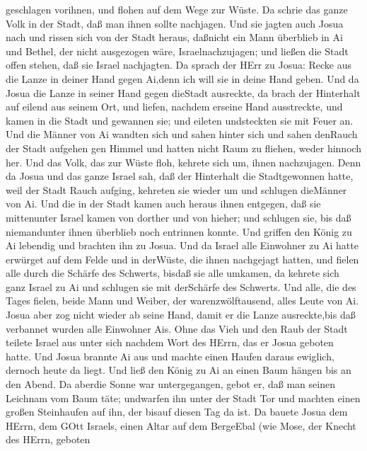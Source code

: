 geschlagen vorihnen, und flohen auf dem Wege zur Wüste.  Da
schrie das ganze Volk in der Stadt, daß man ihnen sollte nachjagen.
 Und sie jagten auch Josua nach und rissen sich von der
Stadt heraus, daßnicht ein Mann überblieb in Ai und Bethel, der nicht
ausgezogen wäre, Israelnachzujagen; und ließen die Stadt offen stehen,
daß sie Israel nachjagten.  Da sprach der HErr zu Josua:
Recke aus die Lanze in deiner Hand gegen Ai,denn ich will sie in deine
Hand geben. Und da Josua die Lanze in seiner Hand gegen dieStadt
ausreckte,  da brach der Hinterhalt auf eilend aus seinem
Ort, und liefen, nachdem erseine Hand ausstreckte, und kamen in die
Stadt und gewannen sie; und eileten undsteckten sie mit Feuer an.
 Und die Männer von Ai wandten sich und sahen hinter sich
und sahen denRauch der Stadt aufgehen gen Himmel und hatten nicht Raum
zu fliehen, weder hinnoch her. Und das Volk, das zur Wüste floh, kehrete
sich um, ihnen nachzujagen.  Denn da Josua und das ganze
Israel sah, daß der Hinterhalt die Stadtgewonnen hatte, weil der Stadt
Rauch aufging, kehreten sie wieder um und schlugen dieMänner von Ai.
 Und die in der Stadt kamen auch heraus ihnen entgegen, daß
sie mittenunter Israel kamen von dorther und von hieher; und schlugen
sie, bis daß niemandunter ihnen überblieb noch entrinnen konnte.
 Und griffen den König zu Ai lebendig und brachten ihn zu
Josua.  Und da Israel alle Einwohner zu Ai hatte erwürget
auf dem Felde und in derWüste, die ihnen nachgejagt hatten, und fielen
alle durch die Schärfe des Schwerts, bisdaß sie alle umkamen, da kehrete
sich ganz Israel zu Ai und schlugen sie mit derSchärfe des Schwerts.
 Und alle, die des Tages fielen, beide Mann und Weiber, der
warenzwölftausend, alles Leute von Ai.  Josua aber zog
nicht wieder ab seine Hand, damit er die Lanze ausreckte,bis daß
verbannet wurden alle Einwohner Ais.  Ohne das Vieh und den
Raub der Stadt teilete Israel aus unter sich nachdem Wort des HErrn, das
er Josua geboten hatte.  Und Josua brannte Ai aus und
machte einen Haufen daraus ewiglich, dernoch heute da liegt.
 Und ließ den König zu Ai an einen Baum hängen bis an den
Abend. Da aberdie Sonne war untergegangen, gebot er, daß man seinen
Leichnam vom Baum täte; undwarfen ihn unter der Stadt Tor und machten
einen großen Steinhaufen auf ihn, der bisauf diesen Tag da ist.
 Da bauete Josua dem HErrn, dem GOtt Israels, einen Altar
auf dem BergeEbal  (wie Mose, der Knecht des HErrn, geboten
